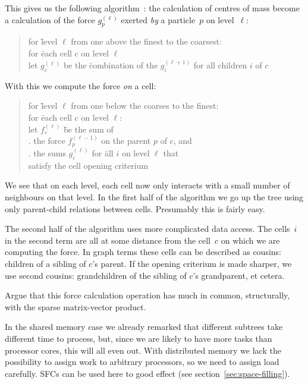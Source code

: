 This gives us the following algorithm~\cite{Katzenelson:nbody}: the
calculation of centres of mass become a calculation of the force
$g^{(\ell)}_p$ exerted \emph{by} a particle~$p$ on level~$\ell$:
\begin{quotation}
  \begin{tabbing}
    for \=level $\ell$ from one above the finest to the coarsest:\\
    \>for \=each cell $c$ on level $\ell$\\
    \>\>let $g^{(\ell)}_c$ be the \=combination of the $g^{(\ell+1)}_i$
    for all children $i$ of $c$
  \end{tabbing}
\end{quotation}
With this we compute the force \emph{on} a cell:
\begin{quotation}
  \begin{tabbing}
    for \=level $\ell$ from one below the coarses to the finest:\\
    \>for \=each cell $c$ on level $\ell$:\\
    \>\>let $f^{(\ell)}_c$ \=be the sum of\\
    \>\>. the force $f^{(\ell-1)}_p$ on the parent $p$ of $c$, and\\
    \>\>. the sums $g^{(\ell)}_i$ for \=all $i$ on level $\ell$ that\\
    \>\>\>\>satisfy the cell opening criterium
  \end{tabbing}
\end{quotation}

We see that on each level, each cell now only interacts with a small
number of neighbours on that level. In the first half of the algorithm
we go up the tree using only parent-child relations between
cells. Presumably this is fairly easy.

The second half of the algorithm uses more complicated data
access. The cells~$i$ in the second term are all at some distance from
the cell~$c$ on which we are computing the force. In graph terms these
cells can be described as cousins: children of a sibling of $c$'s
parent. If the opening criterium is made sharper, we use second
cousins: grandchildren of the sibling of $c$'s grandparent, et cetera.


\begin{exercise}
  Argue that this force calculation operation has much in common,
  structurally, with the sparse matrix-vector product.
\end{exercise}

In the shared memory case we already remarked that different subtrees
take different time to process, but, since we are likely to have more
tasks than processor cores, this will all even out. With distributed
memory we lack the possibility to assign work to arbitrary processors,
so we need to assign load carefully. \acfp{SFC} can be used here 
to good effect (see section~\ref{sec:space-filling}).

